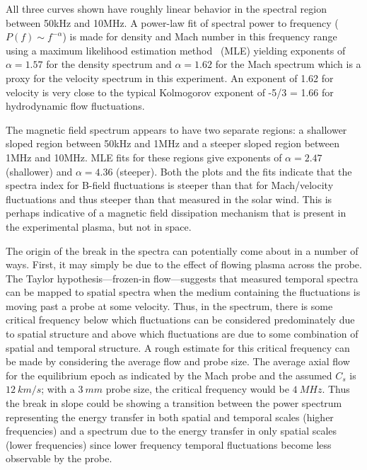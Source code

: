 \documentclass[12pt]{iopart}
\begin{document}
All three curves shown have roughly linear behavior in the spectral region between 50kHz and 10MHz. A power-law fit of spectral power to frequency ($P(f) \sim f^{-\alpha}$) is made for density and Mach number in this frequency range using a maximum likelihood estimation method~\cite{clauset09} (MLE) yielding exponents of $\alpha = 1.57$ for the density spectrum and $\alpha = 1.62$ for the Mach spectrum which is a proxy for the velocity spectrum in this experiment. An exponent of 1.62 for velocity is very close to the typical Kolmogorov exponent of -5/3 = 1.66 for hydrodynamic flow fluctuations.

The magnetic field spectrum appears to have two separate regions: a shallower sloped region between 50kHz and 1MHz and a steeper sloped region between 1MHz and 10MHz. MLE fits for these regions give exponents of $\alpha = 2.47$ (shallower) and $\alpha = 4.36$ (steeper). Both the plots and the fits indicate that the spectra index for B-field fluctuations is steeper than that for Mach/velocity fluctuations and thus steeper than that measured in the solar wind. This is perhaps indicative of a magnetic field dissipation mechanism that is present in the experimental plasma, but not in space.

The origin of the break in the spectra can potentially come about in a number of ways. First, it may simply be due to the effect of flowing plasma across the probe. The Taylor hypothesis---frozen-in flow---suggests that measured temporal spectra can be mapped to spatial spectra when the medium containing the fluctuations is moving past a probe at some velocity. Thus, in the spectrum, there is some critical frequency below which fluctuations can be considered predominately due to spatial structure and above which fluctuations are due to some combination of spatial and temporal structure. A rough estimate for this critical frequency can be made by considering the average flow and probe size. The average axial flow for the equilibrium epoch as indicated by the Mach probe and the assumed $C_{s}$ is $12~km/s$; with a $3~mm$ probe size, the critical frequency would be $4~MHz$. Thus the break in slope could be showing a transition between the power spectrum representing the energy transfer in both spatial and temporal scales (higher frequencies) and a spectrum due to the energy transfer in only spatial scales (lower frequencies) since lower frequency temporal fluctuations become less observable by the probe. 
\end{document}
